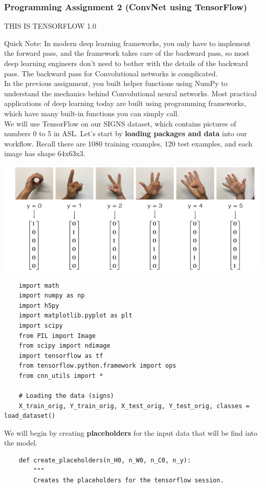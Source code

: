 \documentclass[11pt, a4paper]{article}
\begin{document}
\begin{spacing}{1.1}
	\subsubsection{Programming Assignment 2 (ConvNet using TensorFlow)}
	\begin{center} THIS IS TENSORFLOW 1.0 \end{center}
	Quick Note: In modern deep learning frameworks, you only have to implement the forward pass, and the framework takes care of the backward pass, so most deep learning engineers don't need to bother with the details of the backward pass. The backward pass for Convolutional networks is complicated. \vspace*{2mm}\\
	In the previous assignment, you built helper functions using NumPy to understand the mechanics behind Convolutional neural networks. Most practical applications of deep learning today are built using programming frameworks, which have many built-in functions you can simply call. \vspace*{2mm}\\ 
	We will use TensorFlow on our SIGNS dataset, which contains pictures of numbers 0 to 5 in ASL. Let's start by \textbf{loading packages and data} into our workflow. Recall there are 1080 training examples, 120 test examples, and each image has shape 64x63x3.
	\begin{center}	\includegraphics[scale=.5]{sign_data}	\end{center}
	\begin{lstlisting}
	import math
	import numpy as np
	import h5py
	import matplotlib.pyplot as plt
	import scipy
	from PIL import Image
	from scipy import ndimage
	import tensorflow as tf
	from tensorflow.python.framework import ops
	from cnn_utils import *
	
	# Loading the data (signs)
	X_train_orig, Y_train_orig, X_test_orig, Y_test_orig, classes = load_dataset() \end{lstlisting} \vspace*{1mm}
	We will begin by creating \textbf{placeholders} for the input data that will be find into the model. 
	\begin{lstlisting}
	def create_placeholders(n_H0, n_W0, n_C0, n_y):
		"""
		Creates the placeholders for the tensorflow session.
				

\end{lstlisting}
\end{spacing}
\end{document}
